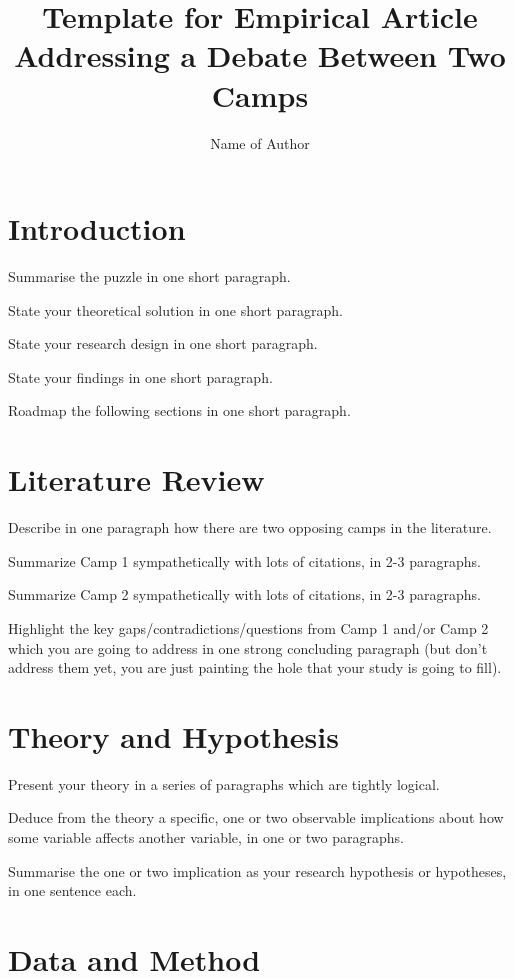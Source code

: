 \documentclass[12pt, oneside]{article}   	%
\title{Template for Empirical Article Addressing a Debate Between Two Camps}
\author{Name of Author}
\date{}							%
\begin{document}
\maketitle


\section{Introduction}

Summarise the puzzle in one short paragraph.

State your theoretical solution in one short paragraph.

State your research design in one short paragraph.

State your findings in one short paragraph.

Roadmap the following sections in one short paragraph.

\section{Literature Review}

Describe in one paragraph how there are two opposing camps in the literature.

Summarize Camp 1 sympathetically with lots of citations, in 2-3 paragraphs.

Summarize Camp 2 sympathetically with lots of citations, in 2-3 paragraphs.

Highlight the key gaps/contradictions/questions from Camp 1 and/or Camp 2 which you are going to address in one strong concluding paragraph (but don't address them yet, you are just painting the hole that your study is going to fill).

\section{Theory and Hypothesis}

Present your theory in a series of paragraphs which are tightly logical.

Deduce from the theory a specific, one or two observable implications about how some variable affects another variable, in one or two paragraphs.

Summarise the one or two implication as your research hypothesis or hypotheses, in one sentence each.

\section{Data and Method}
\end{document}
